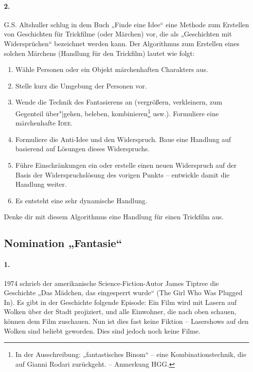 \documentclass[11pt,a4paper]{article}
\begin{document}
\paragraph{2.}
G.S. Altshuller schlug in dem Buch „Finde eine Idee“ eine Methode zum
Erstellen von Geschichten für Trickfilme (oder Märchen) vor, die als
„Geschichten mit Widersprüchen“ bezeichnet werden kann.  Der Algorithmus zum
Erstellen eines solchen Märchens (Handlung für den Trickfilm) lautet wie
folgt:

\begin{enumerate}
\item Wähle Personen oder ein Objekt märchenhaften Charakters aus.
\item Stelle kurz die Umgebung der Personen vor.
\item Wende die Technik des Fantasierens an (vergrößern, verkleinern, zum
  Gegenteil über"|gehen, beleben, kombinieren\footnote{In der Ausschreibung:
    „fantastisches Binom“ -- eine Kombinationstechnik, die auf Gianni Rodari
    zurückgeht. -- Anmerkung HGG.} usw.). Formuliere eine märchenhafte
  \textsc{Idee}.
\item Formuliere die Anti-Idee und den Widerspruch. Baue eine Handlung auf
  basierend auf Lösungen dieses Widerspruchs.
\item Führe Einschränkungen ein oder erstelle einen neuen Widerspruch auf der
  Basis der Widerspruchslösung des vorigen Punkts -- entwickle damit die
  Handlung weiter.
\item Es entsteht eine sehr dynamische Handlung.
\end{enumerate}
Denke dir mit diesem Algorithmus eine Handlung für einen Trickfilm aus.

\subsection*{Nomination „Fantasie“}

\paragraph{1.}
1974 schrieb der amerikanische Science-Fiction-Autor James Tiptree die
Geschichte „Das Mädchen, das eingesperrt wurde“ (The Girl Who Was Plugged In).
Es gibt in der Geschichte folgende Episode: Ein Film wird mit Lasern auf
Wolken über der Stadt projiziert, und alle Einwohner, die nach oben schauen,
können dem Film zuschauen. Nun ist dies fast keine Fiktion -- Lasershows auf
den Wolken sind beliebt geworden. Dies sind jedoch noch keine Filme.
\end{document}
